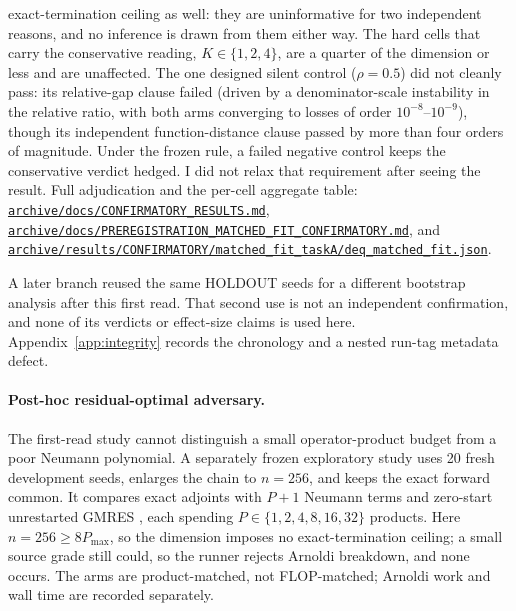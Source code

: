 exact-termination ceiling as well: they are uninformative
for two independent reasons, and no inference is drawn from them either way. The hard
cells that carry the conservative reading, $K\in\{1,2,4\}$, are a quarter of
the dimension or less and are unaffected. The one designed silent
control ($\rho=0.5$) did not cleanly pass: its relative-gap clause failed
(driven by a denominator-scale instability in the relative ratio, with both arms
converging to losses of order $10^{-8}$--$10^{-9}$), though its
independent function-distance clause passed by more than four orders of
magnitude. Under the frozen rule, a failed negative control keeps the
conservative verdict hedged. I did not relax that requirement after seeing the
result. Full adjudication and the per-cell aggregate table:
\href{https://github.com/vanshsehrawat14/gabp-sparse-inv/blob/main/archive/docs/CONFIRMATORY_RESULTS.md}
{\nolinkurl{archive/docs/CONFIRMATORY_RESULTS.md}},
\href{https://github.com/vanshsehrawat14/gabp-sparse-inv/blob/main/archive/docs/PREREGISTRATION_MATCHED_FIT_CONFIRMATORY.md}
{\nolinkurl{archive/docs/PREREGISTRATION_MATCHED_FIT_CONFIRMATORY.md}}, and
\href{https://github.com/vanshsehrawat14/gabp-sparse-inv/blob/main/archive/results/CONFIRMATORY/matched_fit_taskA/deq_matched_fit.json}
{\nolinkurl{archive/results/CONFIRMATORY/matched_fit_taskA/deq_matched_fit.json}}.

A later branch reused the same HOLDOUT seeds for a different bootstrap
analysis after this first read. That second use is not an independent
confirmation, and none of its verdicts or effect-size claims is used here.
Appendix~\ref{app:integrity} records the chronology and a nested run-tag
metadata defect.

\paragraph{Post-hoc residual-optimal adversary.}
The first-read study cannot distinguish a small operator-product budget from a
poor Neumann polynomial. A separately frozen exploratory study uses 20 fresh
development seeds, enlarges the chain to $n=256$, and keeps the exact forward
common. It compares exact adjoints with $P+1$ Neumann terms and zero-start
unrestarted GMRES \citep{saad1986gmres}, each spending
$P\in\{1,2,4,8,16,32\}$ products. Here $n=256\geq8P_{\max}$, so the dimension
imposes no exact-termination ceiling; a small source grade still could, so the
runner rejects Arnoldi breakdown, and none occurs. The arms are
product-matched, not FLOP-matched;
Arnoldi work and wall time are recorded separately.

